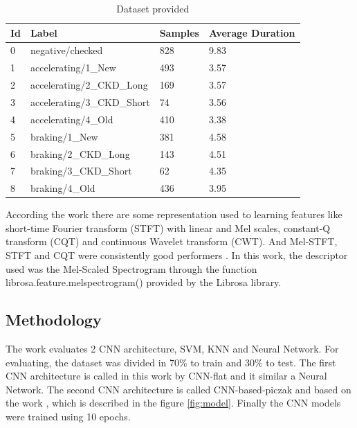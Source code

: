 \documentclass[12pt,oneside,a4paper]{article}
\begin{document}
\begin{table}[H]
	\centering
	\begin{tabular}{@{}llll@{}}
		\toprule
		Id & Label                      & Samples  & Average Duration \\ \midrule
		0  & negative/checked           & 828      & 9.83             \\
		1  & accelerating/1\_New        & 493      & 3.57             \\
		2  & accelerating/2\_CKD\_Long  & 169      & 3.57             \\
		3  & accelerating/3\_CKD\_Short & 74       & 3.56             \\
		4  & accelerating/4\_Old        & 410      & 3.38             \\
		5  & braking/1\_New             & 381      & 4.58             \\
		6  & braking/2\_CKD\_Long       & 143      & 4.51             \\
		7  & braking/3\_CKD\_Short      & 62       & 4.35             \\
		8  & braking/4\_Old             & 436      & 3.95             \\ \bottomrule
	\end{tabular}
	\label{tab:dataset}
	\caption{Dataset provided}
\end{table}

According the work \cite{huzaifah-features} there are some representation used to learning features like short-time Fourier transform (STFT) with linear and Mel scales, constant-Q transform (CQT) and continuous Wavelet transform (CWT). And Mel-STFT, STFT and CQT were consistently good performers \cite{huzaifah-features}. In this work, the descriptor used was the Mel-Scaled Spectrogram through the function librosa.feature.melspectrogram() provided by the Librosa library.




\subsection{Methodology}

The work evaluates 2 CNN architecture, SVM, KNN and Neural Network. For evaluating, the dataset was divided in 70\% to train and 30\% to test. The first CNN architecture is called in this work by CNN-flat and it similar a Neural Network. The second CNN architecture is called CNN-based-piczak and based on the work \cite{huzaifah-features}, which is described in the figure \ref{fig:model}. Finally the CNN models were trained using 10 epochs.
\end{document}
